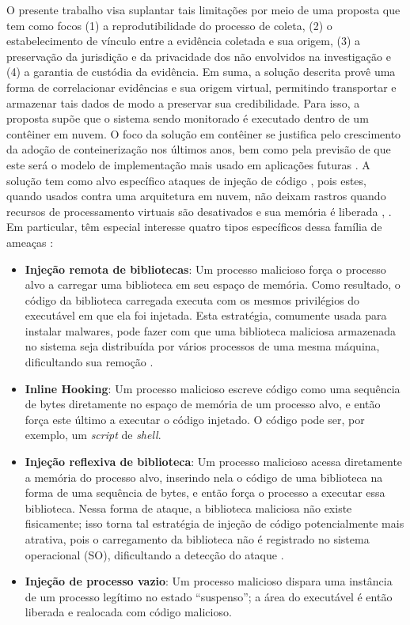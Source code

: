 %
O presente trabalho visa suplantar tais limitações por meio de uma proposta que tem como focos (1) a reprodutibilidade do processo de coleta, (2) o estabelecimento de vínculo entre a evidência coletada e sua origem, (3) a preservação da jurisdição e da privacidade dos não envolvidos na investigação e (4) a garantia de custódia da evidência.
%
Em suma, a solução descrita provê uma forma de correlacionar evidências e sua origem virtual, permitindo transportar e armazenar tais dados de modo a preservar sua credibilidade.
%
Para isso, a proposta supõe que o sistema sendo monitorado é executado dentro de um contêiner em nuvem. 
%
O foco da solução em contêiner se justifica pelo crescimento da adoção de conteinerização nos últimos anos, bem como pela previsão de que este será o modelo de implementação mais usado em aplicações futuras \cite{PiraghajContainerCloudComputing:2016}.
%
A solução tem como alvo específico ataques de injeção de código \cite{CaseMemoryForensics:2014}, pois estes, quando usados contra uma arquitetura em nuvem, não deixam rastros quando recursos de processamento virtuais são desativados e sua memória é liberada \cite{VomelMemoryAcquisition:2013}, \cite{CaseMemoryForensics:2014}.
%
Em particular, têm especial interesse quatro tipos específicos dessa família de ameaças \cite{CaseMemoryForensics:2014}:


\begin{itemize}
 \item \textbf{Injeção remota de bibliotecas}: Um processo malicioso força o processo alvo a carregar uma biblioteca em seu espaço de memória.
 Como resultado, o código da biblioteca carregada executa com os mesmos privilégios do executável em que ela foi injetada. 
 Esta estratégia, comumente usada para instalar malwares, pode fazer com que uma biblioteca maliciosa armazenada no sistema seja distribuída por vários processos de uma mesma máquina, dificultando sua remoção \cite{MillerRemoteLibraryInjection:2004}.
 \item \textbf{Inline Hooking}: Um processo malicioso escreve código como uma sequência de bytes diretamente no espaço de memória de um processo alvo, e então força este último a executar o código injetado. 
 O código pode ser, por exemplo, um \textit{script} de \textit{shell}.
 \item \textbf{Injeção reflexiva de biblioteca}: Um processo malicioso acessa diretamente a memória do processo alvo, inserindo nela o código de uma biblioteca na forma de uma sequência de bytes, e então força o processo a executar essa biblioteca. 
 Nessa forma de ataque, a biblioteca maliciosa não existe fisicamente; isso torna tal estratégia de injeção de código potencialmente mais atrativa, pois o carregamento da biblioteca não é registrado no sistema operacional (SO), dificultando a detecção do ataque \cite{FewerReflectiveLibraryInject:2008}.
 \item \textbf{Injeção de processo vazio}: Um processo malicioso dispara uma instância de um processo legítimo no estado ``suspenso''; a área do executável é então liberada e realocada com código malicioso.
\end{itemize}

